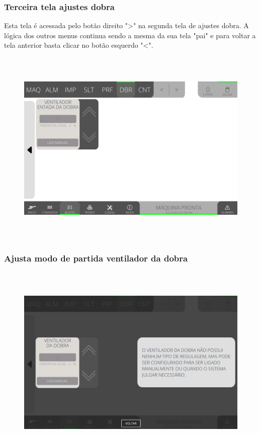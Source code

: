 \subsubsection{\small{Terceira tela ajustes dobra}}\label{miniTelaAjustesDobra3}
Esta tela é acessada pelo botão direito "\textgreater" na segunda tela de ajustes dobra. A lógica dos outros menus continua sendo a mesma da sua tela "pai" e para voltar a tela anterior basta clicar no botão esquerdo "\textless{}".
\vspace*{\fill}
\begin{figure}[h]
  \centering
  \includegraphics[width=576px,height=360px]{src/imagesMiniline/07-Folder/Settings/e5.png}
\end{figure}
\vspace*{\fill}


\newpage
\thispagestyle{fancy}
\vspace*{40 pt}
\subsubsection{\small{Ajusta modo de partida ventilador da dobra}}\label{miniTelaAjustesDobra3AjustaModoPartidaVentiladorDobra}
\vspace*{\fill}
\begin{figure}[h]
  \centering
  \includegraphics[width=576px,height=360px]{src/imagesMiniline/07-Folder/Settings/e6.png}
\end{figure}
\vspace*{\fill}

